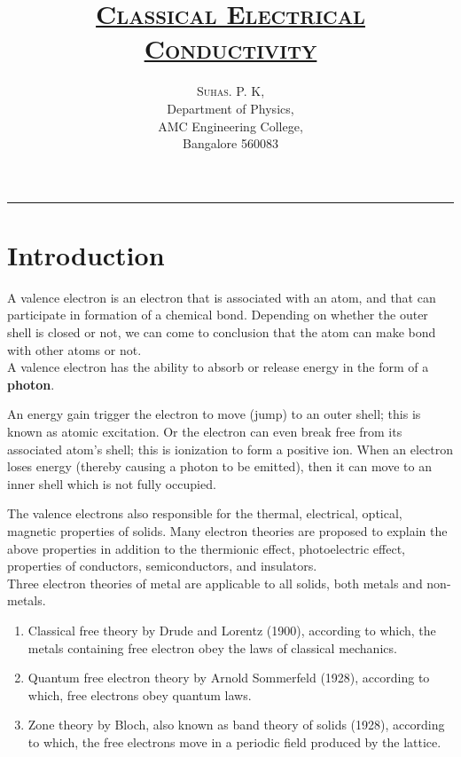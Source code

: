 \documentclass[15pt]{article}
\title{\huge{\underline{\scshape{Classical Electrical Conductivity}}}}
\author{\Large{\scshape{Suhas. P. K}},\\ Department of Physics,\\ AMC Engineering College, \\ Bangalore 560083}
\date{}
\begin{document}
\maketitle
\hrule \relax

\large{\tableofcontents}


\newpage
\section*{\textbf{Introduction}}

A valence electron is an electron that is associated with an atom, and that can participate in formation of a chemical bond. Depending on whether the outer shell is closed or not, we can come to conclusion that the atom can make bond with other atoms or not.
\\
A valence electron has the ability to absorb or release energy in the form of a \textbf{photon}.
\vspace{0.2cm}

An energy gain trigger the electron to move (jump) to an outer shell; this is known as atomic excitation. Or the electron can even break free from its associated atom's shell; this is ionization to form a positive ion. When an electron loses energy (thereby causing a photon to be emitted), then it can move to an inner shell which is not fully occupied. 
\vspace{0.2cm}

The valence electrons also responsible for the thermal, electrical, optical, magnetic properties of solids. Many electron theories are proposed to explain the above properties in addition to the thermionic effect, photoelectric effect, properties of conductors, semiconductors, and insulators.
\\
Three electron theories of metal are applicable to all solids, both metals and non-metals. 
\begin{enumerate}
    \item Classical free theory by Drude and Lorentz (1900), according to which, the metals containing free electron obey the laws of classical mechanics.
    \item Quantum free electron theory by Arnold Sommerfeld (1928), according to which, free electrons obey quantum laws.
    \item Zone theory by Bloch, also known as band theory of solids (1928), according to which, the free electrons move in a periodic field produced by the lattice.
\end{enumerate}
\end{document}
